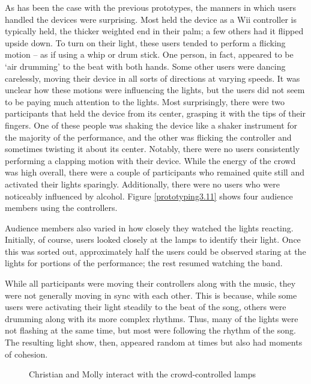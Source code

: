 As has been the case with the previous prototypes, the manners in which users handled the devices were surprising. Most held the device as a Wii controller is typically held, the thicker weighted end in their palm; a few others had it flipped upside down. To turn on their light, these users tended to perform a flicking motion -- as if using a whip or drum stick. One person, in fact, appeared to be `air drumming' to the beat with both hands. Some other users were dancing carelessly, moving their device in all sorts of directions at varying speeds. It was unclear how these motions were influencing the lights, but the users did not seem to be paying much attention to the lights. Most surprisingly, there were two participants that held the device from its center, grasping it with the tips of their fingers. One of these people was shaking the device like a shaker instrument for the majority of the performance, and the other was flicking the controller and sometimes twisting it about its center. Notably, there were no users consistently performing a clapping motion with their device. While the energy of the crowd was high overall, there were a couple of participants who remained quite still and activated their lights sparingly. Additionally, there were no users who were noticeably influenced by alcohol. Figure \ref{prototyping3.11} shows four audience members using the controllers.

Audience members also varied in how closely they watched the lights reacting. Initially, of course, users looked closely at the lamps to identify their light. Once this was sorted out, approximately half the users could be observed staring at the lights for portions of the performance; the rest resumed watching the band.

While all participants were moving their controllers along with the music, they were not generally moving in sync with each other. This is because, while some users were activating their light steadily to the beat of the song, others were drumming along with its more complex rhythms. Thus, many of the lights were not flashing at the same time, but most were following the rhythm of the song. The resulting light show, then, appeared random at times but also had moments of cohesion.

\begin{figure}
	\centering

	\hspace{0.1cm}

	\caption{Christian and Molly interact with the crowd-controlled lamps}

	\label{prototyping3.12}
\end{figure}

